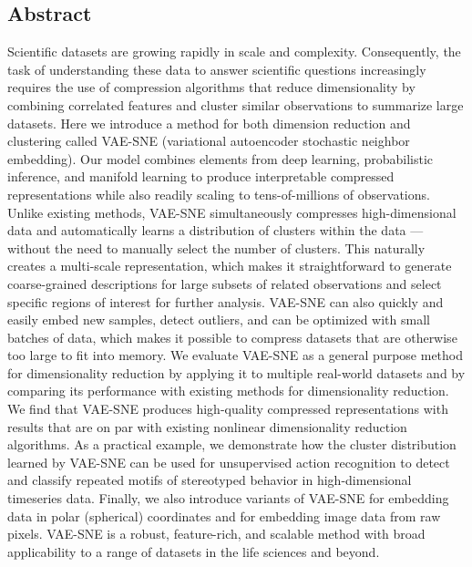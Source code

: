 \documentclass[11pt,a4paper,oneside]{book}
\begin{document}
\begin{doublespace}
\section{Abstract}

Scientific datasets are growing rapidly in scale and complexity. Consequently, the task of understanding these data to answer scientific questions increasingly requires the use of compression algorithms that
reduce dimensionality by combining correlated features and cluster similar observations to summarize
large datasets. Here we introduce a method for both dimension reduction and clustering called
VAE-SNE (variational autoencoder stochastic neighbor embedding). Our model combines elements from
deep learning, probabilistic inference, and manifold learning to produce interpretable compressed
representations while also readily scaling to tens-of-millions of observations. Unlike existing methods,
VAE-SNE simultaneously compresses high-dimensional data and automatically learns a distribution of
clusters within the data — without the need to manually select the number of clusters. This naturally
creates a multi-scale representation, which makes it straightforward to generate coarse-grained
descriptions for large subsets of related observations and select specific regions of interest for further
analysis. VAE-SNE can also quickly and easily embed new samples, detect outliers, and can be optimized
with small batches of data, which makes it possible to compress datasets that are otherwise too large to
fit into memory. We evaluate VAE-SNE as a general purpose method for dimensionality reduction by
applying it to multiple real-world datasets and by comparing its performance with existing methods for
dimensionality reduction. We find that VAE-SNE produces high-quality compressed representations with
results that are on par with existing nonlinear dimensionality reduction algorithms. As a practical
example, we demonstrate how the cluster distribution learned by VAE-SNE can be used for unsupervised
action recognition to detect and classify repeated motifs of stereotyped behavior in high-dimensional
timeseries data. Finally, we also introduce variants of VAE-SNE for embedding data in polar (spherical)
coordinates and for embedding image data from raw pixels. VAE-SNE is a robust, feature-rich, and
scalable method with broad applicability to a range of datasets in the life sciences and beyond.


\end{doublespace}
\end{document}
